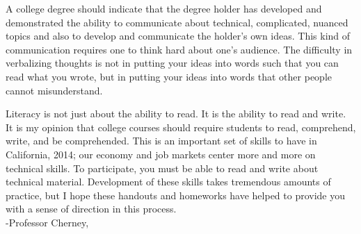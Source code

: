 \documentclass[12pt]{article}
\begin{document}
A college degree should indicate that the degree holder has developed and demonstrated the ability to communicate about technical, complicated, nuanced topics and also to develop and communicate the holder's own ideas. 
This kind of communication requires one to think hard about one's audience. The difficulty in verbalizing thoughts is not in putting your ideas into words such that you can read what you wrote, but in putting your ideas into words that other people cannot misunderstand. 

Literacy is not just about the ability to read. It is the ability to read and write. 
It is my opinion that college courses should require students to read, comprehend, write, and be comprehended. This is an important set of skills to have in California, 2014; 
our economy and job markets center more and more on technical skills. 
To participate, you must be able to read and write about technical material. 
Development of these skills takes tremendous amounts of practice, but I hope these handouts and homeworks have helped to provide you with a sense of direction in this process. 
\\


-Professor Cherney, \\




%
%



%



\end{document}
